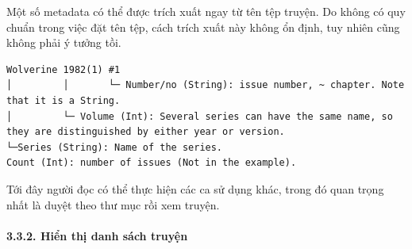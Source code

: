 Một số metadata có thể được trích xuất ngay từ tên tệp truyện. Do không
có quy chuẩn trong việc đặt tên tệp, cách trích xuất này không ổn định,
tuy nhiên cũng không phải ý tưởng tồi.

\begin{verbatim}
Wolverine 1982(1) #1
│         │       └─ Number/no (String): issue number, ~ chapter. Note that it is a String.
│         └─ Volume (Int): Several series can have the same name, so they are distinguished by either year or version.
└─Series (String): Name of the series.
Count (Int): number of issues (Not in the example).
\end{verbatim}

Tới đây người đọc có thể thực hiện các ca sử dụng khác, trong đó quan
trọng nhất là duyệt theo thư mục rồi xem truyện.

\hypertarget{hiux1ec3n-thux1ecb-danh-suxe1ch-truyux1ec7n}{%
  \paragraph{\texorpdfstring{3.3.2. Hiển thị danh sách truyện
    }{3.3.2. Hiển thị danh sách truyện }}\label{hiux1ec3n-thux1ecb-danh-suxe1ch-truyux1ec7n}}

